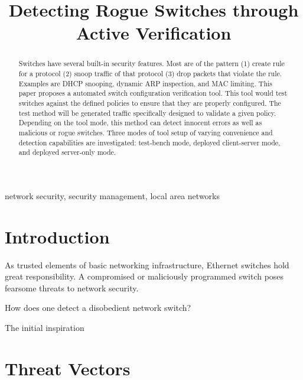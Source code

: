 \documentclass[journal]{IEEEtran}
\begin{document}
\title{Detecting Rogue Switches through Active Verification}

\author{
}

\maketitle

\begin{abstract}
Switches have several built-in security features. Most are of the pattern (1) create rule for a
protocol (2) snoop traffic of that protocol (3) drop packets that violate the rule. Examples are
DHCP snooping, dynamic ARP inspection, and MAC limiting. This paper proposes a automated switch
configuration verification tool. This tool would test switches against the defined policies to
ensure that they are properly configured. The test method will be generated traffic specifically
designed to validate a given policy. Depending on the tool mode, this method can detect innocent
errors as well as malicious or rogue switches. Three modes of tool setup of varying convenience and
detection capabilities are investigated: test-bench mode, deployed client-server mode, and deployed
server-only mode.
\end{abstract}

\begin{IEEEkeywords}
network security, security management, local area networks
\end{IEEEkeywords}

\section{Introduction}

As trusted elements of basic networking infrastructure, Ethernet switches hold great
responsibility. A compromised or maliciously programmed switch poses fearsome threats to network
security.

How does one detect a disobedient network
switch?

The initial inspiration

\section{Threat Vectors}
\end{document}
